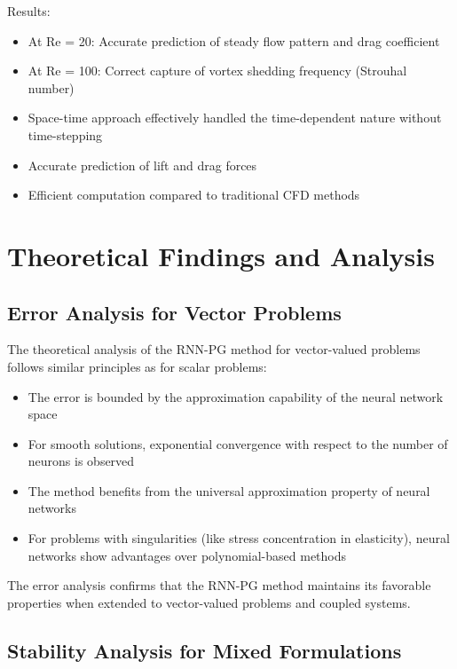 \documentclass[11pt,a4paper]{article}
\begin{document}
Results:
\begin{itemize}
    \item At Re = 20: Accurate prediction of steady flow pattern and drag coefficient
    \item At Re = 100: Correct capture of vortex shedding frequency (Strouhal number)
    \item Space-time approach effectively handled the time-dependent nature without time-stepping
    \item Accurate prediction of lift and drag forces
    \item Efficient computation compared to traditional CFD methods
\end{itemize}

\section{Theoretical Findings and Analysis}

\subsection{Error Analysis for Vector Problems}

The theoretical analysis of the RNN-PG method for vector-valued problems follows similar principles as for scalar problems:

\begin{itemize}
    \item The error is bounded by the approximation capability of the neural network space
    \item For smooth solutions, exponential convergence with respect to the number of neurons is observed
    \item The method benefits from the universal approximation property of neural networks
    \item For problems with singularities (like stress concentration in elasticity), neural networks show advantages over polynomial-based methods
\end{itemize}

The error analysis confirms that the RNN-PG method maintains its favorable properties when extended to vector-valued problems and coupled systems.

\subsection{Stability Analysis for Mixed Formulations}
\end{document}
